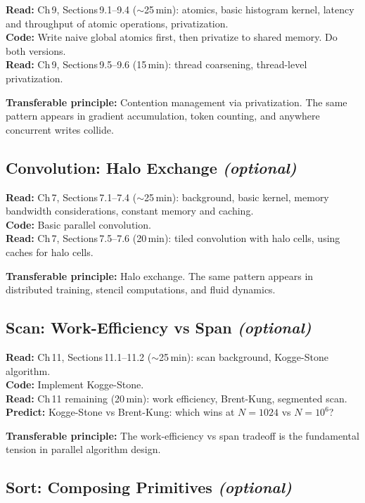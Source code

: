 \documentclass[11pt, letterpaper]{article}
\begin{document}
\textbf{Read:} Ch\,9, Sections\,9.1--9.4 ($\sim$25\,min): atomics, basic histogram kernel, latency and throughput of atomic operations, privatization.\\
\textbf{Code:} Write naive global atomics first, then privatize to shared memory. Do both versions.\\
\textbf{Read:} Ch\,9, Sections\,9.5--9.6 (15\,min): thread coarsening, thread-level privatization.

\begin{tastebox}
\textbf{Transferable principle:} Contention management via privatization. The same pattern appears in gradient accumulation, token counting, and anywhere concurrent writes collide.
\end{tastebox}

\subsection{Convolution: Halo Exchange \emph{(optional)}}

\textbf{Read:} Ch\,7, Sections\,7.1--7.4 ($\sim$25\,min): background, basic kernel, memory bandwidth considerations, constant memory and caching.\\
\textbf{Code:} Basic parallel convolution.\\
\textbf{Read:} Ch\,7, Sections\,7.5--7.6 (20\,min): tiled convolution with halo cells, using caches for halo cells.

\textbf{Transferable principle:} Halo exchange. The same pattern appears in distributed training, stencil computations, and fluid dynamics.

\subsection{Scan: Work-Efficiency vs Span \emph{(optional)}}

\textbf{Read:} Ch\,11, Sections\,11.1--11.2 ($\sim$25\,min): scan background, Kogge-Stone algorithm.\\
\textbf{Code:} Implement Kogge-Stone.\\
\textbf{Read:} Ch\,11 remaining (20\,min): work efficiency, Brent-Kung, segmented scan.\\
\textbf{Predict:} Kogge-Stone vs Brent-Kung: which wins at $N=1024$ vs $N=10^6$?

\textbf{Transferable principle:} The work-efficiency vs span tradeoff is the fundamental tension in parallel algorithm design.

\subsection{Sort: Composing Primitives \emph{(optional)}}
\end{document}

